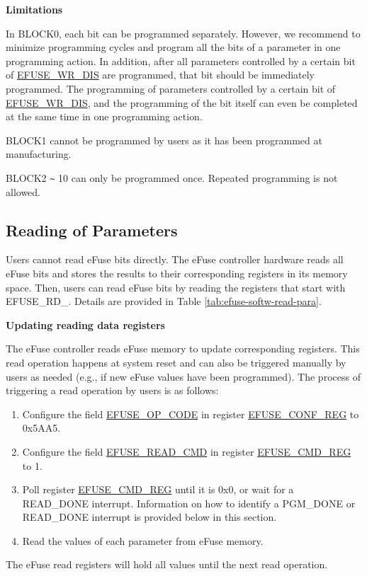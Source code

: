 \documentclass[main\_\_EN.tex]{subfiles}
\begin{document}
{\bfseries Limitations}

In BLOCK0, each bit can be programmed separately. However, we recommend to minimize programming cycles and program all the bits of a parameter in one programming action. In addition, after all parameters controlled by a certain bit of \hyperref[fielddesc:EFUSEWRDIS]{EFUSE\_WR\_DIS} are programmed, that bit should be immediately programmed. The programming of parameters controlled by a certain bit of \hyperref[fielddesc:EFUSEWRDIS]{EFUSE\_WR\_DIS},
and the programming of the bit itself can even be completed at the same time in one programming action.

BLOCK1 cannot be programmed by users as it has been programmed at manufacturing.

BLOCK2 \verb+~+ 10 can only be programmed once. Repeated programming is not allowed.

\subsection{Reading of Parameters}
\label{sec:efuse-software-read-para}

Users cannot read eFuse bits directly. The eFuse controller hardware reads all eFuse bits and stores the results to their corresponding registers in its memory space. Then, users can read eFuse bits by reading the registers that start with EFUSE\_RD\_. Details are provided in Table \ref{tab:efuse-softw-read-para}.



{\bfseries Updating reading data registers}
\label{sec:efuse-update-reg}

The eFuse controller reads eFuse memory to update corresponding registers. This read operation happens at system reset and can also be triggered manually by users as needed (e.g., if new eFuse values have been programmed). The process of triggering a read operation by users is as follows:

\begin{enumerate}
    \item Configure the field \hyperref[fielddesc:EFUSEOPCODE]{EFUSE\_OP\_CODE} in register \hyperref[regdesc:EFUSECONFREG]{EFUSE\_CONF\_REG} to 0x5AA5.
    \item Configure the field \hyperref[fielddesc:EFUSEREADCMD]{EFUSE\_READ\_CMD} in register \hyperref[regdesc:EFUSECMDREG]{EFUSE\_CMD\_REG} to 1.
    \item Poll register \hyperref[regdesc:EFUSECMDREG]{EFUSE\_CMD\_REG} until it is 0x0, or wait for a READ\_DONE interrupt. Information on how to identify a PGM\_DONE or READ\_DONE interrupt is provided below in this section.
    \item Read the values of each parameter from eFuse memory.
\end{enumerate}
The eFuse read registers will hold all values until the next read operation.
\end{document}
